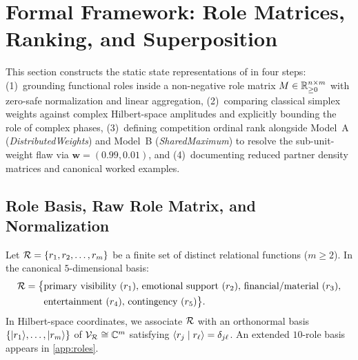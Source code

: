 \section{Formal Framework: Role Matrices, Ranking, and Superposition}
\label{sec:framework}

This section constructs the static state representations of \RST{} in four steps:
(1)~grounding functional roles inside a non-negative role matrix $M \in \mathbb{R}_{\ge 0}^{n \times m}$
with zero-safe normalization and linear aggregation, (2)~comparing classical simplex
weights against complex Hilbert-space amplitudes and explicitly bounding the role of
complex phases, (3)~defining competition ordinal rank alongside Model~A
(\emph{DistributedWeights}) and Model~B (\emph{SharedMaximum}) to resolve the
sub-unit-weight flaw via $\mathbf{w} = (0.99, 0.01)$, and (4)~documenting reduced
partner density matrices and canonical worked examples.

\subsection{Role Basis, Raw Role Matrix, and Normalization}
\label{subsec:fw-primitives}

\begin{definition}
\label{def:role}
Let $\mathcal{R} = \{r_1, r_2, \dots, r_m\}$ be a finite set of distinct relational
functions ($m \ge 2$). In the canonical $5$-dimensional \RST{} basis:
\begin{align*}
  \mathcal{R} = \bigl\{&\text{primary visibility } (r_1),\, \text{emotional support } (r_2),\,
  \text{financial/material } (r_3), \\
  &\text{entertainment } (r_4),\, \text{contingency } (r_5)\bigr\}.
\end{align*}
In Hilbert-space coordinates, we associate $\mathcal{R}$ with an orthonormal basis
$\{\lvert r_1 \rangle, \dots, \lvert r_m \rangle\}$ of $\mathcal{V}_{\mathcal{R}} \cong \mathbb{C}^m$ satisfying
$\langle r_j \mid r_\ell \rangle = \delta_{j\ell}$. An extended $10$-role basis appears in \cref{app:roles}.
\end{definition}

